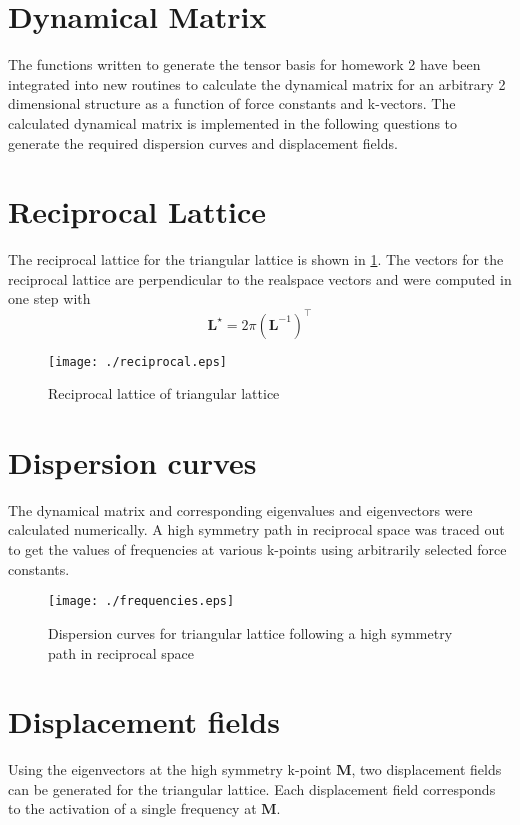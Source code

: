 \documentclass[12pt, fleqn]{article}
\begin{document}
\section{Dynamical Matrix}
The functions written to generate the tensor basis for homework 2 have been integrated into new routines to calculate the
dynamical matrix for an arbitrary 2 dimensional structure as a function of force constants and k-vectors.
The calculated dynamical matrix is implemented in the following questions to generate the required dispersion curves
and displacement fields.

\section{Reciprocal Lattice}
The reciprocal lattice for the triangular lattice is shown in \cref{fig:reciprocal}. The vectors for the reciprocal lattice
are perpendicular to the realspace vectors and were computed in one step with
\begin{equation}
    \mathbf{L^\star}=2\pi \left( \mathbf{L}^{-1} \right)^{\intercal}
    \label{recip}
\end{equation}

\begin{figure}[h]
    \begin{center}
        \texttt{[image: ./reciprocal.eps]}
    \end{center}
    \caption{Reciprocal lattice of triangular lattice}
    \label{fig:reciprocal}
\end{figure}

\section{Dispersion curves}
The dynamical matrix and corresponding eigenvalues and eigenvectors were calculated numerically.
A high symmetry path in reciprocal space was traced out to get the values of frequencies at various k-points using arbitrarily selected force constants.

\begin{figure}[h]
    \begin{center}
        \texttt{[image: ./frequencies.eps]}
    \end{center}
    \caption{Dispersion curves for triangular lattice following a high symmetry path in reciprocal space}
    \label{fig:dispersion}
\end{figure}

\section{Displacement fields}
Using the eigenvectors at the high symmetry k-point $\mathbf{M}$, two displacement fields can be generated for the triangular lattice.
Each displacement field corresponds to the activation of a single frequency at $\mathbf{M}$.
\end{document}
